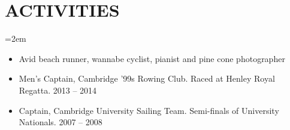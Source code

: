 \documentclass[letterpaper,10pt]{article}
\newcommand{\NewPart}[1]{\vspace{-1em} \section*{\uppercase{#1}}}
\newcommand{\Details}[1]{\hangindent=2em\hangafter=0\small#1\normalsize\par}
\begin{document}
\NewPart{Activities}

\Details{
\begin{itemize}
 \item Avid beach runner, wannabe cyclist, pianist and  pine cone photographer
 \item Men's Captain, Cambridge '99s Rowing Club. Raced at Henley Royal Regatta. 2013 -- 2014
 \item Captain, Cambridge University Sailing Team. Semi-finals of University Nationals. 2007 -- 2008
\end{itemize}
}
\end{document}
